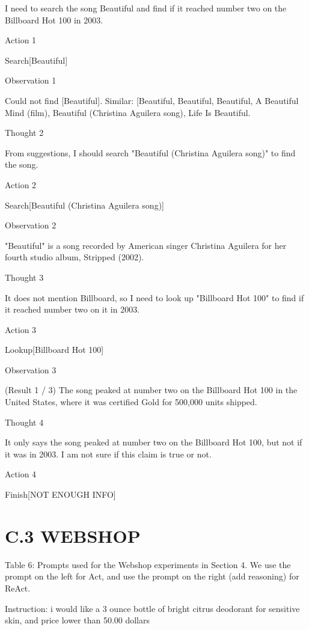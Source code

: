 \documentclass[
]{article}
\begin{document}
I need to search the song Beautiful and find if it reached number two on
the Billboard Hot 100 in 2003.

Action 1

Search{[}Beautiful{]}

Observation 1

Could not find {[}Beautiful{]}. Similar:
{[}\textquotesingle Beautiful\textquotesingle,
\textquotesingle Beautiful, Beautiful\textquotesingle,
\textquotesingle A Beautiful Mind (film)\textquotesingle,
\textquotesingle Beautiful (Christina Aguilera song)\textquotesingle,
\textquotesingle Life Is Beautiful\textquotesingle{]}.

Thought 2

From suggestions, I should search "Beautiful (Christina Aguilera song)"
to find the song.

Action 2

Search{[}Beautiful (Christina Aguilera song){]}

Observation 2

"Beautiful" is a song recorded by American singer Christina Aguilera for
her fourth studio album, Stripped (2002).

Thought 3

It does not mention Billboard, so I need to look up "Billboard Hot 100"
to find if it reached number two on it in 2003.

Action 3

Lookup{[}Billboard Hot 100{]}

Observation 3

(Result 1 / 3) The song peaked at number two on the Billboard Hot 100 in
the United States, where it was certified Gold for 500,000 units
shipped.

Thought 4

It only says the song peaked at number two on the Billboard Hot 100, but
not if it was in 2003. I am not sure if this claim is true or not.

Action 4

Finish{[}NOT ENOUGH INFO{]}

\section{C.3 WEBSHOP}\label{c.3-webshop}

Table 6: Prompts used for the Webshop experiments in Section 4. We use
the prompt on the left for Act, and use the prompt on the right (add
reasoning) for ReAct.

Instruction: i would like a 3 ounce bottle of bright citrus deodorant
for sensitive skin, and price lower than 50.00 dollars
\end{document}
